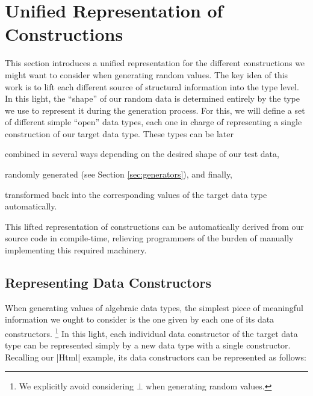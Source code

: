 \section{Unified Representation of Constructions}
\label{sec:representation}

%
This section introduces a unified representation for the different constructions
we might want to consider when generating random values.
%
The key idea of this work is to lift each different source of structural
information into the type level.
%
In this light, the ``shape'' of our random data is determined entirely by
the type we use to represent it during the generation process.
%
For this, we will define a set of different simple ``open'' data types,
each one in charge of representing a single construction of our target data
type.
%
These types can be later
\begin{inparaenum}[(i)]
\item combined in several ways depending on the desired shape of our test data,
\item randomly generated (see Section \ref{sec:generators}), and finally,
\item transformed back into the corresponding values of the target data type
  automatically.
\end{inparaenum}
%
This lifted representation of constructions can be automatically derived from
our source code in compile-time, relieving programmers of the burden of manually
implementing this required machinery.


%
\subsection{Representing Data Constructors}

When generating values of algebraic data types, the simplest piece of meaningful
information we ought to consider is the one given by each one of its data
constructors.
%
\footnote{We explicitly avoid considering $\bot$ when generating random values.}
%
In this light, each individual data constructor of the target data type can be
represented simply by a new data type with a single constructor.
%
Recalling our |Html| example, its data constructors can be represented as
follows:

